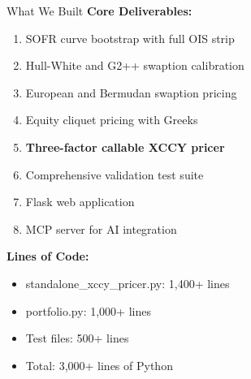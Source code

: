 \documentclass[aspectratio=169,11pt]{beamer}
\begin{document}
\begin{frame}{What We Built}
\textbf{Core Deliverables:}
\begin{enumerate}
    \item SOFR curve bootstrap with full OIS strip
    \item Hull-White and G2++ swaption calibration
    \item European and Bermudan swaption pricing
    \item Equity cliquet pricing with Greeks
    \item \textbf{Three-factor callable XCCY pricer}
    \item Comprehensive validation test suite
    \item Flask web application
    \item MCP server for AI integration
\end{enumerate}

\textbf{Lines of Code:}
\begin{itemize}
    \item standalone\_xccy\_pricer.py: 1,400+ lines
    \item portfolio.py: 1,000+ lines
    \item Test files: 500+ lines
    \item Total: 3,000+ lines of Python
\end{itemize}
\end{frame}
\end{document}
